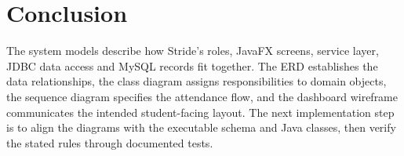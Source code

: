 \documentclass[a4paper,10pt]{article}
\begin{document}
\section*{Conclusion}
The system models describe how Stride's roles, JavaFX screens, service layer, JDBC data access and MySQL records fit together. The ERD establishes the data relationships, the class diagram assigns responsibilities to domain objects, the sequence diagram specifies the attendance flow, and the dashboard wireframe communicates the intended student-facing layout. The next implementation step is to align the diagrams with the executable schema and Java classes, then verify the stated rules through documented tests.
\end{document}
